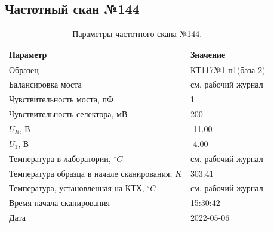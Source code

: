\subsection{Частотный скан №144}
\begin{table}[!ht]
    \centering
    \caption{Параметры частотного скана №144.}
    \begin{tabular}{|l|l|}
        \hline
        Параметр                                       & Значение                  \\ \hline
        Образец                                        & КТ117№1 п1(база 2)        \\ \hline
        Балансировка моста                             & см. рабочий журнал        \\ \hline
        Чувствительность моста, пФ                     & 1                         \\ \hline
        Чувствительность селектора, мВ                 & 200                       \\ \hline
        $U_R$, В                                       & -11.00                    \\ \hline
        $U_1$, В                                       & -4.00                     \\ \hline
        Температура в лаборатории, $^\circ C$          & см. рабочий журнал        \\ \hline
        Температура образца в начале сканирования, $K$ & 303.41                    \\ \hline
        Температура, установленная на КТХ, $^\circ C$  & см. рабочий журнал        \\ \hline
        Время начала сканирования                      & 15:30:42                  \\ \hline
        Дата                                           & 2022-05-06                \\ \hline
    \end{tabular}
    \label{table:frequency_scan_144}
\end{table}

